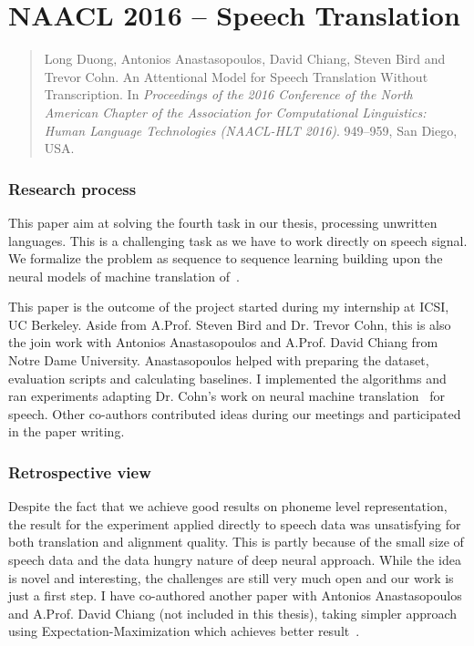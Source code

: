 \documentclass[12pt,twoside,final,hidelinks]{ltthesis}
\theoremstyle{definition}
\begin{document}



\section{NAACL 2016 -- Speech Translation}
\label{sec:naacl16}
\begin{quote}
Long Duong, Antonios Anastasopoulos, David Chiang, Steven Bird and Trevor Cohn. An Attentional Model for Speech Translation Without Transcription. In\textit{ Proceedings of the 2016 Conference of the North American Chapter of the Association for Computational Linguistics: Human Language Technologies (NAACL-HLT 2016)}. 949--959, San Diego, USA.
\end{quote}

\subsubsection{Research process}
This paper aim at solving the fourth task in our thesis, processing unwritten languages. This is a challenging task as we have to work directly on speech 
signal. We formalize the problem as sequence to sequence learning building upon the neural models of machine translation of~. 

This paper is the outcome of the project started during my internship at ICSI, UC Berkeley. Aside from A.Prof. Steven Bird and Dr. Trevor Cohn, this is also the join work with Antonios Anastasopoulos and A.Prof. David Chiang from Notre Dame University. Anastasopoulos helped with preparing the dataset, evaluation scripts and calculating baselines. I implemented the algorithms and ran experiments adapting Dr. Cohn's work on neural machine translation~\cite{cohn-EtAl:2016:N16-1} for speech. Other co-authors contributed ideas during our meetings and participated in the paper writing. 

\subsubsection{Retrospective view}
Despite the fact that we achieve good results on phoneme level representation, the result for the experiment applied directly to speech data was unsatisfying for both 
translation and alignment quality. This is partly because of the small size of speech 
data and the data hungry nature of deep neural approach. While the idea is novel and interesting, the challenges are still very much open and our work is just a first step. I have co-authored another paper with Antonios Anastasopoulos and A.Prof. David Chiang (not included in this thesis), taking simpler approach using Expectation-Maximization which achieves better result~\cite{anastasopoulos-chiang-duong:2016:EMNLP2016}.
\end{document}

